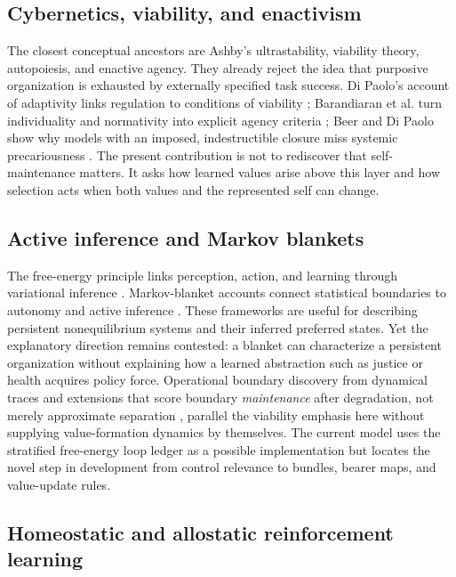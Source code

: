\documentclass[11pt]{article}
\begin{document}
\subsection{Cybernetics, viability, and enactivism}

The closest conceptual ancestors are Ashby's ultrastability, viability theory, autopoiesis, and enactive agency. They already reject the idea that purposive organization is exhausted by externally specified task success. Di Paolo's account of adaptivity links regulation to conditions of viability \citep{dipaolo2005}; Barandiaran et al. turn individuality and normativity into explicit agency criteria \citep{barandiaran2009}; Beer and Di Paolo show why models with an imposed, indestructible closure miss systemic precariousness \citep{beer2023}. The present contribution is not to rediscover that self-maintenance matters. It asks how learned values arise above this layer and how selection acts when both values and the represented self can change.

\subsection{Active inference and Markov blankets}

The free-energy principle links perception, action, and learning through variational inference \citep{friston2010free}. Markov-blanket accounts connect statistical boundaries to autonomy and active inference \citep{kirchhoff2018}. These frameworks are useful for describing persistent nonequilibrium systems and their inferred preferred states. Yet the explanatory direction remains contested: a blanket can characterize a persistent organization without explaining how a learned abstraction such as justice or health acquires policy force. Operational boundary discovery from dynamical traces \citep{zarncke2025uad} and extensions that score boundary \emph{maintenance} after degradation, not merely approximate separation \citep{zarncke2026maintained}, parallel the viability emphasis here without supplying value-formation dynamics by themselves. The current model uses the stratified free-energy loop ledger \citep{zarncke2025stratification} as a possible implementation but locates the novel step in development from control relevance to bundles, bearer maps, and value-update rules.

\subsection{Homeostatic and allostatic reinforcement learning}
\end{document}
